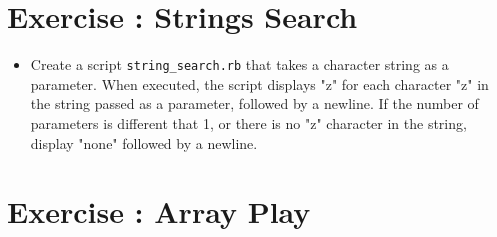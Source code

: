 \documentclass{42-en}
\begin{document}


\chapter{Exercise \exercicenumber: Strings Search}

\exnumber{\exercicenumber}


\begin{itemize}

\item Create a script \texttt{string\_search.rb} that takes a character string as a parameter. When executed, the script displays "z" for each character "z" in the string passed as a parameter, followed by a newline.
If the number of parameters is different that 1, or there is no "z" character in the string, display "none" followed by a newline.


\end{itemize}



\chapter{Exercise \exercicenumber: Array Play}
\end{document}
